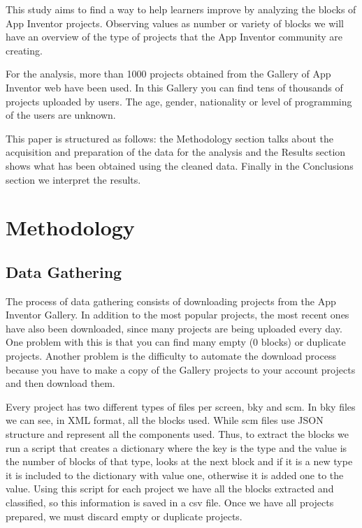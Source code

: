 \documentclass[a4paper]{article}
\begin{document}

This study aims to find a way to help learners improve by analyzing the blocks of App Inventor projects. Observing values as number or variety of blocks we will have an overview of the type of projects that the App Inventor community are creating.

For the analysis, more than 1000 projects obtained from the Gallery of App Inventor web have been used. 
In this Gallery you can find tens of thousands of projects uploaded by users. The age, gender, nationality or level of programming of the users are unknown.

This paper is structured as follows: the Methodology section talks about the acquisition and preparation of the data for the analysis and the Results section shows what has been obtained using the cleaned data. Finally in the Conclusions section we interpret the results.

\section{Methodology}


\subsection{Data Gathering}

The process of data gathering consists of downloading projects from the App Inventor Gallery. In addition to the most popular projects, the most recent ones have also been downloaded, since many projects are being uploaded every day. One problem with this is that you can find many empty (0 blocks) or duplicate projects. Another problem is the difficulty to automate the download process because you have to make a copy of the Gallery projects to your account projects and then download them.


Every project has two different types of files per screen, bky and scm. In bky files we can see, in XML format, all the blocks used. While scm files use JSON structure and represent all the components used. Thus, to extract the blocks we run a script that creates a dictionary where the key is the type and the value is the number of blocks of that type, looks at the next block and if it is a new type it is included to the dictionary with value one, otherwise it is added one to the value. Using this script for each project we have all the blocks extracted and classified, so this information is saved in a csv file. Once we have all projects prepared, we must discard empty or duplicate projects.
\end{document}
